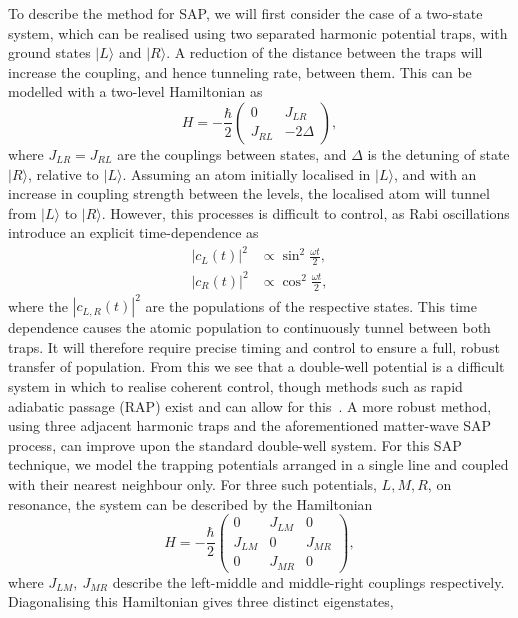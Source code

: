 To describe the method for SAP, we will first consider the case of a two-state system, which can be realised using two separated harmonic potential traps, with ground states $| L \rangle$ and $| R \rangle$. A reduction of the distance between the traps will increase the coupling, and hence tunneling rate, between them. This can be modelled with a two-level Hamiltonian as
\begin{equation}
    H = -\frac{\hbar}{2}
    \begin{pmatrix}
        0 & J_{LR} \\
        J_{RL} & -2\Delta
    \end{pmatrix},
\end{equation}
where $J_{LR} = J_{RL}$ are the couplings between states, and $\Delta$ is the detuning of state $| R \rangle$, relative to $| L \rangle$. Assuming an atom initially localised in $| L \rangle$, and with an increase in coupling strength between the levels, the localised atom will tunnel from $| L \rangle$ to $| R \rangle $. However, this processes is difficult to control, as Rabi oscillations introduce an explicit time-dependence as
\begin{subequations}
\begin{align}
    |c_L(t)|^2 &\propto \sin^2 \frac{\omega t}{2} ,\\
    |c_R(t)|^2 &\propto \cos^2 \frac{\omega t}{2},
\end{align}
\end{subequations}
where the $|c_{L,R}(t)|^2$ are the populations of the respective states. This time dependence causes the atomic population to continuously tunnel between both traps. It will therefore require precise timing and control to ensure a full, robust transfer of population. From this we see that a double-well potential is a difficult system in which to realise coherent control, though methods such as rapid adiabatic passage (RAP) exist and can allow for this~\cite{AO:Vitanov_arpc_2001}. A more robust method, using three adjacent harmonic traps and the aforementioned matter-wave SAP process, can improve upon the standard double-well system. For this SAP technique, we model the trapping potentials arranged in a single line and coupled with their nearest neighbour only. For three such potentials, $L,M,R$, on resonance, the system can be described by the Hamiltonian
\begin{equation}\label{eqn:sap_ham}
    H = -\frac{\hbar}{2}
    \begin{pmatrix}
        0 & J_{LM} & 0 \\
        J_{LM} & 0 & J_{MR} \\
        0 & J_{MR} & 0
    \end{pmatrix},
\end{equation}
where $J_{LM},~J_{MR}$ describe the left-middle and middle-right couplings respectively. Diagonalising this Hamiltonian gives three distinct eigenstates,

